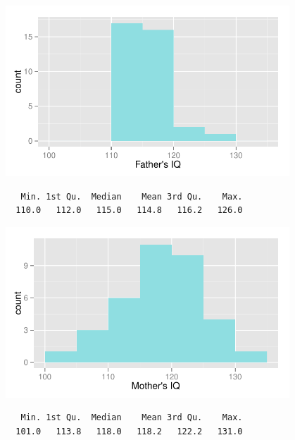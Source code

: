 \documentclass[11pt]{article}
\begin{document}
\begin{enumerate}
\begin{minipage}[c]{0.5\textwidth}
\begin{center}
\includegraphics[width=0.8\textwidth]{figures/gifted/fatheriq_hist.pdf}
{\footnotesize
\begin{verbatim}
   Min. 1st Qu.  Median    Mean 3rd Qu.    Max. 
  110.0   112.0   115.0   114.8   116.2   126.0 
\end{verbatim}
}
\end{center}
\end{minipage}
\begin{minipage}[c]{0.5\textwidth}
\begin{center}
\includegraphics[width=0.8\textwidth]{figures/gifted/motheriq_hist.pdf}
\end{center}
{\footnotesize
\begin{verbatim}
   Min. 1st Qu.  Median    Mean 3rd Qu.    Max. 
  101.0   113.8   118.0   118.2   122.2   131.0 
\end{verbatim}
}
\end{minipage}

\begin{enumerate}


\end{enumerate}
\end{enumerate}
\end{document}

